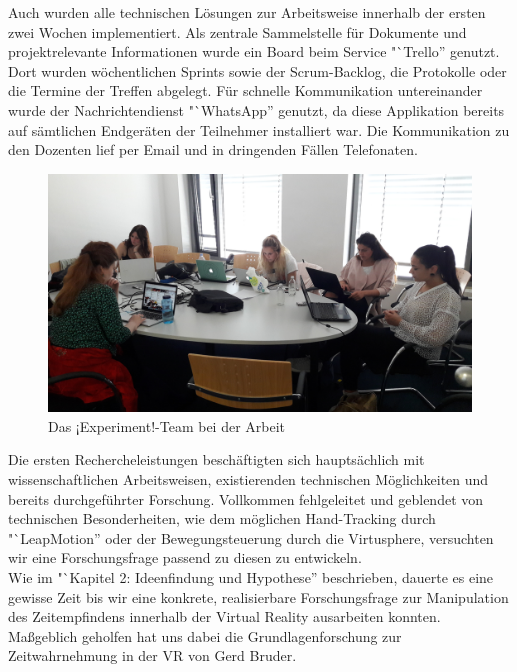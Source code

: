 \documentclass{Bericht}
\begin{document}
Auch wurden alle technischen Lösungen zur Arbeitsweise innerhalb der ersten zwei Wochen implementiert. Als zentrale Sammelstelle für Dokumente und projektrelevante Informationen wurde ein Board beim Service "`Trello'' genutzt. Dort wurden wöchentlichen Sprints sowie der Scrum-Backlog, die Protokolle oder die Termine der Treffen abgelegt. Für schnelle Kommunikation untereinander wurde der Nachrichtendienst "`WhatsApp'' genutzt, da diese Applikation bereits auf sämtlichen Endgeräten der Teilnehmer installiert war. Die Kommunikation zu den Dozenten lief per Email und in dringenden Fällen Telefonaten.
		
		\begin{figure}[H] %
			\centering
			\includegraphics[width=\linewidth, height=\textheight, keepaspectratio]{../Bilder/20170518_103125.jpg}
			\caption{Das ¡Experiment!-Team bei der Arbeit}
			\label{img:experiment-team-bei-der-arbeit}
		\end{figure}
		
		Die ersten Rechercheleistungen beschäftigten sich hauptsächlich mit wissenschaftlichen Arbeitsweisen, existierenden technischen Möglichkeiten und bereits durchgeführter Forschung. Vollkommen fehlgeleitet und geblendet von technischen Besonderheiten, wie dem möglichen Hand-Tracking durch "`LeapMotion'' oder der Bewegungsteuerung durch die Virtusphere, versuchten wir eine Forschungsfrage passend zu diesen zu entwickeln.\\
		Wie im "`Kapitel 2: Ideenfindung und Hypothese'' beschrieben, dauerte es eine gewisse Zeit bis wir eine konkrete, realisierbare Forschungsfrage zur Manipulation des Zeitempfindens innerhalb der Virtual Reality ausarbeiten konnten. Maßgeblich geholfen hat uns dabei die Grundlagenforschung zur Zeitwahrnehmung in der VR von Gerd Bruder.
\end{document}
